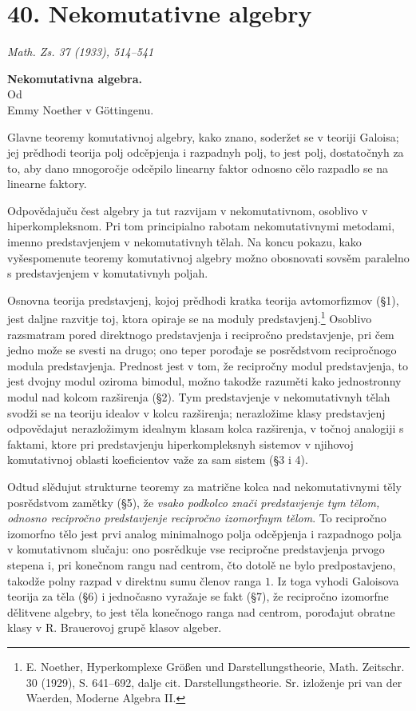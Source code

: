 \documentclass[11pt]{article}
\newcommand{\foreign}[1]{#1}
\begin{document}
\section*{40. Nekomutativne algebry}

\begin{center}
\emph{\foreign{Math. Zs. 37 (1933), 514--541}}
\end{center}

\begin{center}
\textbf{Nekomutativna algebra.}\\[0.5em]
Od\\[0.25em]
Emmy Noether v Göttingenu.
\end{center}

Glavne teoremy komutativnoj algebry, kako znano, soderžet se v teoriji Galoisa; jej prědhodi teorija polj odcěpjenja i razpadnyh polj, to jest polj, dostatočnyh za to, aby dano mnogoročje odcěpilo linearny faktor odnosno cělo razpadlo se na linearne faktory.

Odpovědajuču čest algebry ja tut razvijam v nekomutativnom, osoblivo v hiperkompleksnom. Pri tom principialno rabotam nekomutativnymi metodami, imenno predstavjenjem v nekomutativnyh tělah. Na koncu pokazu, kako vyšespomenute teoremy komutativnoj algebry možno obosnovati sovsěm paralelno s predstavjenjem v komutativnyh poljah.

Osnovna teorija predstavjenj, kojoj prědhodi kratka teorija avtomorfizmov (§1), jest daljne razvitje toj, ktora opiraje se na moduly predstavjenj.\footnote{E. Noether, \foreign{Hyperkomplexe Größen und Darstellungstheorie}, Math. Zeitschr. 30 (1929), S. 641--692, dalje cit. \foreign{Darstellungstheorie}. Sr. izloženje pri van der Waerden, \foreign{Moderne Algebra II}.} Osoblivo razsmatram pored direktnogo predstavjenja i recipročno predstavjenje, pri čem jedno može se svesti na drugo; ono teper porođaje se posrědstvom recipročnogo modula predstavjenja. Prednost jest v tom, že recipročny modul predstavjenja, to jest dvojny modul oziroma bimodul, možno takodže razuměti kako jednostronny modul nad kolcom razširenja (§2). Tym predstavjenje v nekomutativnyh tělah svodži se na teoriju idealov v kolcu razširenja; nerazložime klasy predstavjenj odpovědajut nerazložimym idealnym klasam kolca razširenja, v točnoj analogiji s faktami, ktore pri predstavjenju hiperkompleksnyh sistemov v njihovoj komutativnoj oblasti koeficientov važe za sam sistem (§3 i 4).

Odtud slědujut strukturne teoremy za matrične kolca nad nekomutativnymi těly posrědstvom zamětky (§5), že \emph{vsako podkolco znači predstavjenje tym tělom, odnosno recipročno predstavjenje recipročno izomorfnym tělom}. To recipročno izomorfno tělo jest prvi analog minimalnogo polja odcěpjenja i razpadnogo polja v komutativnom slučaju: ono posrědkuje vse recipročne predstavjenja prvogo stepena i, pri konečnom rangu nad centrom, čto dotolě ne bylo predpostavjeno, takodže polny razpad v direktnu sumu členov ranga \(1\). Iz toga vyhodi Galoisova teorija za těla (§6) i jednočasno vyražaje se fakt (§7), že recipročno izomorfne dělitvene algebry, to jest těla konečnogo ranga nad centrom, porođajut obratne klasy v R. Brauerovoj grupě klasov algeber.
\end{document}
